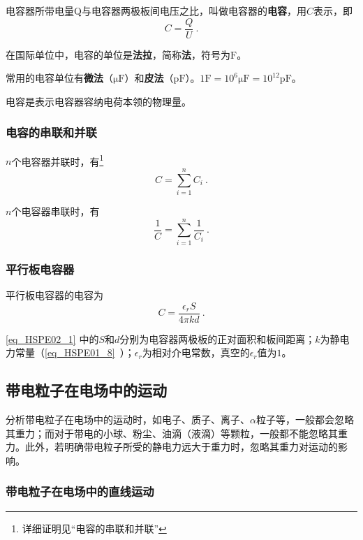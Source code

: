 电容器所带电量Q与电容器两极板间电压之比，叫做电容器的\textbf{电容}，用$C$表示，即
\begin{equation}
C=\frac{Q}{U}~.
\end{equation}

在国际单位中，电容的单位是\textbf{法拉}，简称\textbf{法}，符号为$\mathrm{F}$。

常用的电容单位有\textbf{微法}（$\mathrm{\mu F}$）和\textbf{皮法}（$\mathrm{pF}$）。$1\mathrm{F}=10^6 \mathrm{\mu F}=10^{12} \mathrm{pF}$。

电容是表示电容器容纳电荷本领的物理量。

\subsubsection{电容的串联和并联}
$n$个电容器并联时，有\footnote{详细证明见“电容的串联和并联”}
\begin{equation}
C=\sum_{i=1}^{n}C_i~.
\end{equation}

$n$个电容器串联时，有
\begin{equation}
\frac{1}{C}=\sum_{i=1}^{n}\frac{1}{C_i}~.
\end{equation}

\subsubsection{平行板电容器}

平行板电容器的电容为
\begin{equation}\label{eq_HSPE02_1}
C = \frac {\epsilon_r S}{4\pi kd}~.
\end{equation}

\autoref{eq_HSPE02_1} 中的$S$和$d$分别为电容器两极板的正对面积和板间距离；$k$为静电力常量（\autoref{eq_HSPE01_8}~）；$\epsilon_r$为相对介电常数，真空的$\epsilon_r$值为$1$。

\subsection{带电粒子在电场中的运动}

分析带电粒子在电场中的运动时，如电子、质子、离子、$\alpha$粒子等，一般都会忽略其重力；而对于带电的小球、粉尘、油滴（液滴）等颗粒，一般都不能忽略其重力。此外，若明确带电粒子所受的静电力远大于重力时，忽略其重力对运动的影响。

\subsubsection{带电粒子在电场中的直线运动}

